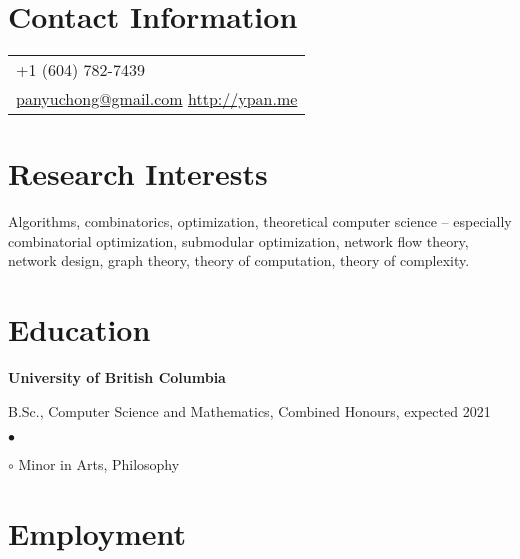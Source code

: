 \documentclass[margin,line]{res}
\newenvironment{list1}{
  \begin{list}{\ding{113}}{%
      \setlength{\itemsep}{0in}
      \setlength{\parsep}{0.025in} \setlength{\parskip}{0in}
      \setlength{\topsep}{0in} \setlength{\partopsep}{0in}
      \setlength{\leftmargin}{0.17in}}}{\end{list}}
\newenvironment{list2}{
  \begin{list}{$\bullet$}{%
      \setlength{\itemsep}{0in}
      \setlength{\parsep}{0in} \setlength{\parskip}{0in}
      \setlength{\topsep}{0in} \setlength{\partopsep}{0in}
      \setlength{\leftmargin}{0.2in}}}{\end{list}}
\begin{document}

\begin{resume}

\section{\sc Contact Information}

\vspace{.05in}
\begin{tabular}{p{2in}}
+1 (604) 782-7439 \\
\href{mailto:panyuchong@gmail.com}{panyuchong@gmail.com}
\href{http://ypan.me/}{http://ypan.me}
\end{tabular}


\section{\sc Research Interests}
Algorithms, combinatorics, optimization, theoretical computer science -- especially combinatorial optimization, submodular optimization, network flow theory, network design, graph theory, theory of computation, theory of complexity.

\section{\sc Education}

{\bf University of British Columbia}\\
\vspace*{-.1in}
\begin{list1}
\item[] B.Sc., Computer Science and Mathematics, Combined Honours, expected 2021
  \begin{list2}
  \item[$\circ$] Minor in Arts, Philosophy
  \end{list2}
\end{list1}


\section{\sc Employment}


\end{resume}
\end{document}
